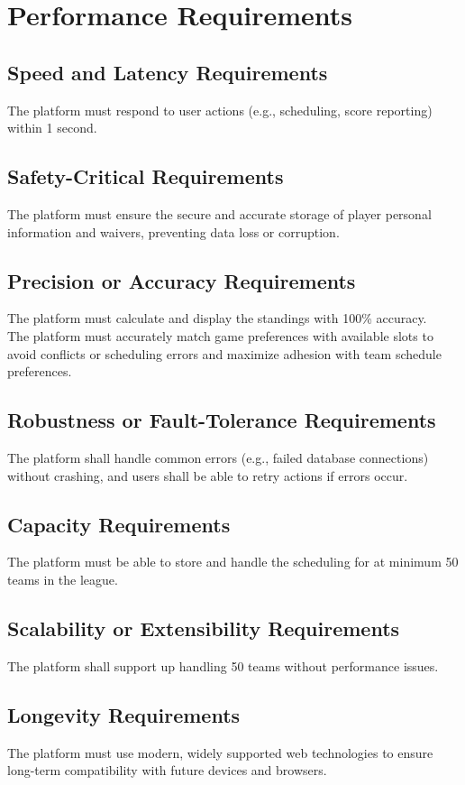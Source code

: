 \documentclass[12pt]{article}
\begin{document}
\section{Performance Requirements}
\subsection{Speed and Latency Requirements}
The platform must respond to user actions (e.g., scheduling, score reporting) within 1 second.

\subsection{Safety-Critical Requirements}
The platform must ensure the secure and accurate storage of player personal information and waivers, preventing data loss or corruption.

\subsection{Precision or Accuracy Requirements}
The platform must calculate and display the standings with 100\% accuracy.\\

\noindent The platform must accurately match game preferences with available slots to avoid conflicts or scheduling errors and maximize adhesion with team schedule preferences.

\subsection{Robustness or Fault-Tolerance Requirements}
The platform shall handle common errors (e.g., failed database connections) without crashing, and users shall be able to retry actions if errors occur.

\subsection{Capacity Requirements}
The platform must be able to store and handle the scheduling for at minimum 50 teams in the league.

\subsection{Scalability or Extensibility Requirements}
The platform shall support up handling 50 teams without performance issues.

\subsection{Longevity Requirements}
The platform must use modern, widely supported web technologies to ensure long-term compatibility with future devices and browsers.
\end{document}
